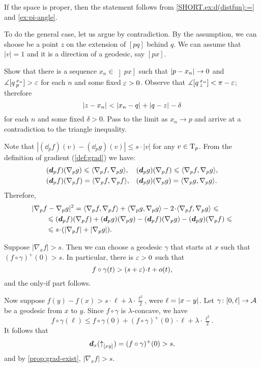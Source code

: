 If the space is proper, then the statement follows from \ref{SHORT.ex:d(distfun):=} and \ref{ex:pi-angle}.

To do the general case, let us argue by contradiction.
By the assumption, we can shoose be a point $z$ on the extension of $[pq]$ behind $q$.
We can assume that $|v|=1$ and it is a direction of a geodesic, say $[px]$.

Show that there is a sequence $x_n\in \left]px\right]$ such that $|{p}-{x_n}|_{}^{{}}\to0$ and
$\measuredangle [q\,{}^{x_n}_{p}]>\varepsilon$ for each $n$ and some fixed $\varepsilon>0$.
Observe that $\measuredangle[q\,{}^{x_n}_{z}]<\pi-\varepsilon$; therefore
\[\dist{z}{x_n}{}<\dist{x_n}{q}{}+\dist{q}z{}-\delta\]
for each $n$ and some fixed $\delta>0$.
Pass to the limit as $x_n\to p$ and arrive at a contradiction to the triangle inequality.

Note that
$|(\dd_p f)(v)-(\dd_p g)(v)|\le s\cdot|v|$
for any $v\in \mathrm{T}_p$.
From the definition of gradient (\ref{def:grad}) we have:
\begin{align*}
&(\bm{d}_p f)(\nabla_p g)\leqslant\langle\nabla_p f,\nabla_p g\rangle,
&&(\bm{d}_p g)(\nabla_p f)\leqslant\langle\nabla_p f,\nabla_p g\rangle,
\\
&(\bm{d}_p f)(\nabla_p f)=\langle\nabla_p f,\nabla_p f\rangle,
&&(\bm{d}_p g)(\nabla_p g)=\langle\nabla_p g,\nabla_p g\rangle.
\end{align*}
Therefore,
\begin{align*}
&\dist[2]{\nabla_pf}{\nabla_pg}{}
=\<\nabla_p f,\nabla_p f\>+\<\nabla_p g,\nabla_p g\>-2\cdot\<\nabla_p f,\nabla_p g\>
\le
\\
&\qquad\le (\dd_p f)(\nabla_p f)+(\dd_p g)(\nabla_p g)-
(\dd_p f)(\nabla_p g)-(\dd_p g)(\nabla_p f)
\le
\\
&\qquad\le s\cdot(|\nabla_p f|+|\nabla_p g|).
\end{align*}

Suppose $|\nabla_xf|> s$.
Then we can choose a geodesic $\gamma$ that starts at $x$ such that 
$(f\circ\gamma)^+(0)>s$.
In particular, there is $\varepsilon>0$ such that
\[f\circ\gamma(t)>(s+\eps)\cdot t+o(t),\]
and the only-if part follows.

Now suppose $f(y)-f(x)>s\cdot \ell+\lambda\cdot \tfrac{\ell^2}2$,
were $\ell=|{x}-{y}|_{}^{{}}$.
Let $\gamma\colon[0,\ell]\to \mathcal{A}$ be a geodesic from $x$ to $y$.
Since $f\circ\gamma$ is $\lambda$-concave, we have
\[f\circ\gamma(\ell)\le f\circ\gamma(0)+(f\circ\gamma)^+(0)\cdot\ell+\lambda\cdot \tfrac{\ell^2}2.\]
It follows that 
\[\bm{d}_x({\uparrow}_{[{x}{y}]_{{}}})=(f\circ\gamma)^+(0)>s,\]
and by \ref{prop:grad-exist}, $|\nabla_x f|>s$.

